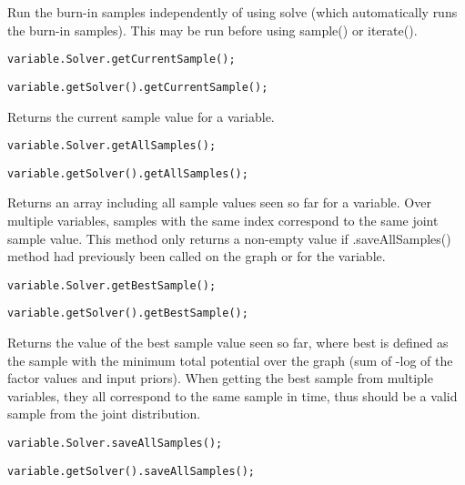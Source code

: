 Run the burn-in samples independently of using solve (which automatically runs the burn-in samples).  This may be run before using sample() or iterate().


\ifmatlab
\begin{lstlisting}
variable.Solver.getCurrentSample();
\end{lstlisting}
\fi

\ifjava
\begin{lstlisting}
variable.getSolver().getCurrentSample();
\end{lstlisting}
\fi

Returns the current sample value for a variable.

\ifmatlab
\begin{lstlisting}
variable.Solver.getAllSamples();
\end{lstlisting}
\fi

\ifjava
\begin{lstlisting}
variable.getSolver().getAllSamples();
\end{lstlisting}
\fi

Returns an array including all sample values seen so far for a variable. Over multiple variables, samples with the same index correspond to the same joint sample value. This method only returns a non-empty value if .saveAllSamples() method had previously been called on the graph or for the variable.

\ifmatlab
\begin{lstlisting}
variable.Solver.getBestSample();
\end{lstlisting}
\fi

\ifjava
\begin{lstlisting}
variable.getSolver().getBestSample();
\end{lstlisting}
\fi


Returns the value of the best sample value seen so far, where best is defined as the sample with the minimum total potential over the graph (sum of -log of the factor values and input priors).  When getting the best sample from multiple variables, they all correspond to the same sample in time, thus should be a valid sample from the joint distribution.

\ifmatlab
\begin{lstlisting}
variable.Solver.saveAllSamples();
\end{lstlisting}
\fi

\ifjava
\begin{lstlisting}
variable.getSolver().saveAllSamples();
\end{lstlisting}
\fi

